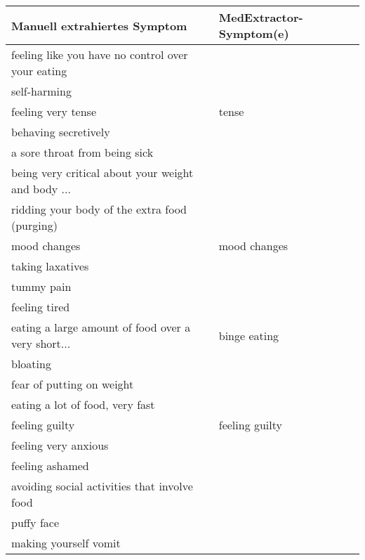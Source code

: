 \begin{table}[H]
\begin{center}
\begin{tabular}{ll}
\toprule
                      Manuell extrahiertes Symptom &       MedExtractor-Symptom(e) \\
\midrule
feeling like you have no control over your eating &                \\
                                      self-harming &                \\
                                feeling very tense &          tense \\
                              behaving secretively &                \\
                     a sore throat from being sick &                \\
being very critical about your weight and body ... &                \\
     ridding your body of the extra food (purging) &                \\
                                      mood changes &   mood changes \\
                                  taking laxatives &                \\
                                        tummy pain &                \\
                                     feeling tired &                \\
eating a large amount of food over a very short... &   binge eating \\
                                          bloating &                \\
                         fear of putting on weight &                \\
                   eating a lot of food, very fast &                \\
                                    feeling guilty & feeling guilty \\
                              feeling very anxious &                \\
                                   feeling ashamed &                \\
      avoiding social activities that involve food &                \\
                                        puffy face &                \\
                             making yourself vomit &                \\

\end{tabular}
\end{center}
\end{table}
